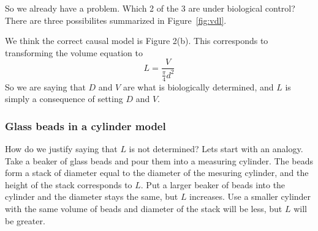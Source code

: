 \documentclass[titlepage]{article}  %
\begin{document}
So we already have a problem. Which 2 of the 3 are under biological control?  There are three possibilites summarized in Figure~\ref{fig:vdl}.

We think the correct causal model is Figure 2(b). This corresponds to transforming the volume equation to
\begin{displaymath}
L = \frac{V}{\frac{\pi}{4} d^{2}}
\end{displaymath}
So we are saying that $D$ and $V$ are what is biologically determined, and $L$ is simply a consequence of setting $D$ and $V$. 

\subsubsection{Glass beads in a cylinder model}
How do we justify saying that $L$ is not determined? Lets start with an analogy. Take a beaker of glass beads and pour them into a measuring cylinder. The beads form a stack of diameter equal to the diameter of the mesuring cylinder, and the height of the stack corresponds to $L$. Put a larger beaker of beads into the cylinder and the diameter stays the same, but $L$ increases. Use a smaller cylinder with the same volume of beads and diameter of the stack will be less, but $L$ will be greater. 
\end{document}
